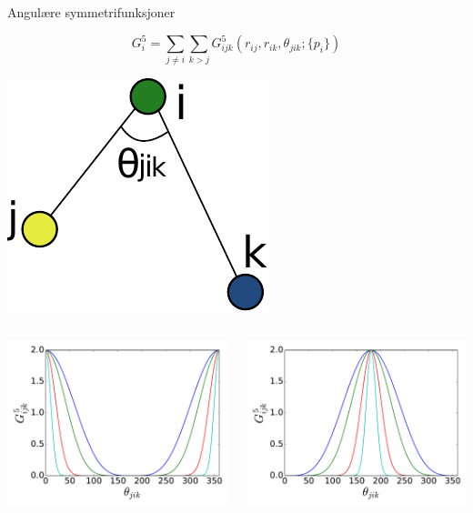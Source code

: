 \documentclass{beamer}
\begin{document}
\begin{frame}{Angulære symmetrifunksjoner}

\begin{equation*}
  G_i^5 = \sum_{j\neq i}\sum_{k>j} G_{ijk}^5(r_{ij}, r_{ik}, \theta_{jik}; \{p_i\})
\end{equation*}

\centering
\includegraphics[width=0.17\linewidth]{../Figures/Presentation/triplet.pdf}

\begin{columns} %
  \begin{column}{0.5\linewidth} %
   \centering
   \includegraphics[width=\linewidth]{../Figures/Presentation/G4G5angular1.pdf}
  \end{column}
  \begin{column}{0.5\linewidth} %
   \centering
   \includegraphics[width=\linewidth]{../Figures/Presentation/G4G5angular2.pdf}
  \end{column}
\end{columns}


\end{frame}
\end{document}
